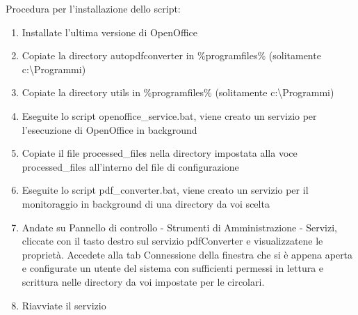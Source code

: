 Procedura per l'installazione dello script:

\begin{enumerate}
\item Installate l'ultima versione di OpenOffice
\item Copiate la directory autopdfconverter in \%programfiles\%  (solitamente c:\backslash Programmi)
\item Copiate la directory utils in  \%programfiles\%  (solitamente c:\backslash Programmi)
\item Eseguite lo script openoffice_service.bat, viene creato un servizio per l'esecuzione di OpenOffice in background
\item Copiate il file processed\_files nella directory impostata alla voce processed\_files all'interno del file di configurazione
\item Eseguite lo script pdf_converter.bat, viene creato un servizio per il monitoraggio in background di una directory da voi scelta
\item Andate su Pannello di controllo - Strumenti di Amministrazione - Servizi, cliccate con il tasto destro sul servizio pdfConverter e visualizzatene le proprietà. Accedete alla tab Connessione della finestra che si è appena aperta  e configurate un utente del sistema con sufficienti permessi in lettura e scrittura nelle directory da voi impostate per le circolari.
\item Riavviate il servizio

\end{enumerate}




